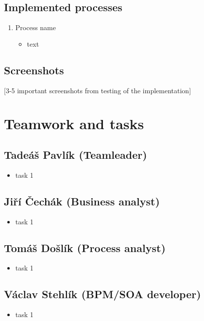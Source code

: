 \documentclass[11pt,a4paper]{article}
\begin{document}
\subsection{Implemented processes}

\begin{enumerate}
    \item Process name
    \begin{itemize}
        \item text
    \end{itemize}
\end{enumerate}

\subsection{Screenshots}

[3-5 important screenshots from testing of the implementation]

\section{Teamwork and tasks}

\subsection{Tadeáš Pavlík (Teamleader)}

\begin{itemize}
    \item task 1
\end{itemize}

\subsection{Jiří Čechák (Business analyst)}

\begin{itemize}
    \item task 1
\end{itemize}

\subsection{Tomáš Došlík (Process analyst)}

\begin{itemize}
    \item task 1
\end{itemize}

\subsection{Václav Stehlík (BPM/SOA developer)}

\begin{itemize}
    \item task 1
\end{itemize}
\end{document}
